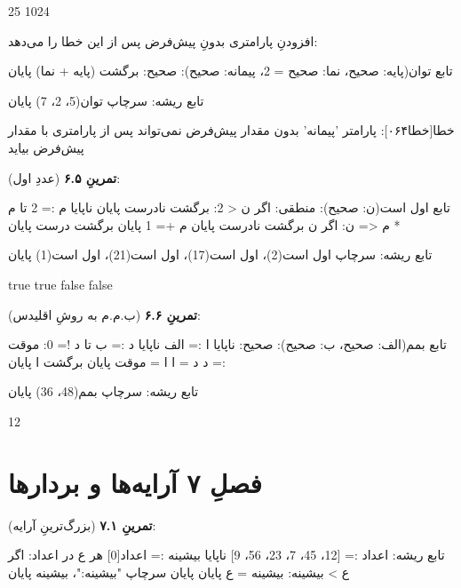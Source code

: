\begin{progoutfa}
25 1024
\end{progoutfa}

افزودنِ پارامتری بدونِ پیش‌فرض پس از  این خطا را می‌دهد:

\begin{salamfa}
تابع توان(پایه: صحیح، نما: صحیح = 2، پیمانه: صحیح): صحیح:
    برگشت (پایه + نما) %
پایان

تابع ریشه:
    سرچاپ توان(5، 2، 7)
پایان
\end{salamfa}

\begin{progoutfa}
خطا[خطا۰۶۴]: پارامتر 'پیمانه' بدون مقدار پیش‌فرض نمی‌تواند پس از پارامتری با مقدار پیش‌فرض بیاید
\end{progoutfa}

\textbf{تمرینِ ۶.۵} (عددِ اول):
\begin{salamfa}
تابع اول است(ن: صحیح): منطقی:
    اگر ن < 2:
        برگشت نادرست
    پایان
    ناپایا م := 2
    تا م * م <= ن:
        اگر ن %
            برگشت نادرست
        پایان
        م += 1
    پایان
    برگشت درست
پایان

تابع ریشه:
    سرچاپ اول است(2)، اول است(17)، اول است(21)، اول است(1)
پایان
\end{salamfa}

\begin{progoutfa}
true true false false
\end{progoutfa}

\textbf{تمرینِ ۶.۶} (ب.م.م به روشِ اقلیدس):
\begin{salamfa}
تابع بمم(الف: صحیح، ب: صحیح): صحیح:
    ناپایا ا := الف
    ناپایا د := ب
    تا د != 0:
        موقت := د
        د = ا %
        ا = موقت
    پایان
    برگشت ا
پایان

تابع ریشه:
    سرچاپ بمم(48، 36)
پایان
\end{salamfa}

\begin{progoutfa}
12
\end{progoutfa}

\section*{فصلِ ۷ آرایه‌ها و بردارها}
{}

\textbf{تمرینِ ۷.۱} (بزرگ‌ترینِ آرایه):
\begin{salamfa}
تابع ریشه:
    اعداد := [12، 45، 7، 23، 56، 9]
    ناپایا بیشینه := اعداد[0]
    هر ع در اعداد:
        اگر ع > بیشینه:
            بیشینه = ع
        پایان
    پایان
    سرچاپ "بیشینه:"، بیشینه
پایان
\end{salamfa}

